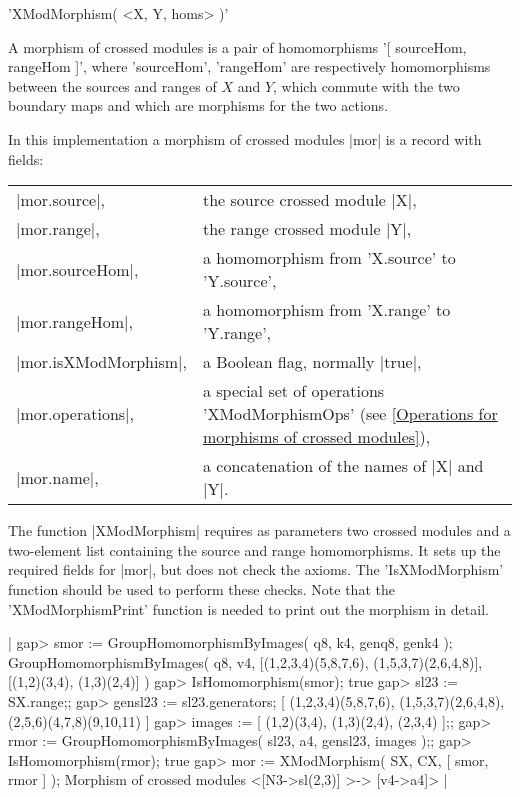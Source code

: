 %

'XModMorphism( <X, Y, homs> )'

A morphism of crossed modules is a pair of homomorphisms
'[ sourceHom, rangeHom ]',  where  'sourceHom', 'rangeHom'
are respectively homomorphisms between the sources and ranges
of  $X$  and  $Y$,  which commute with the two boundary maps
and which are morphisms for the two actions.

In this implementation a morphism of crossed modules  |mor|
is a record with fields:

\begin{tabular}{ll}
|mor.source|,         & the source crossed module  |X|,                \\
|mor.range|,          & the range crossed module  |Y|,                 \\
|mor.sourceHom|,      & a homomorphism from 'X.source' to 'Y.source',  \\
|mor.rangeHom|,       & a homomorphism from 'X.range' to 'Y.range',    \\
|mor.isXModMorphism|, & a Boolean flag, normally |true|,               \\
|mor.operations|,     & a special set of operations 'XModMorphismOps'
              (see \ref{Operations for morphisms of crossed modules}), \\
|mor.name|,           & a concatenation of the names of |X| and |Y|.
\end{tabular}

The function |XModMorphism| requires as parameters two crossed modules
and a two-element list containing the source and range homomorphisms.
It sets up the required fields for |mor|, but does not check the axioms.
The  'IsXModMorphism'  function should be used to perform these checks.
Note that the  'XModMorphismPrint'  function is needed to print out the
morphism in detail.

|    gap> smor := GroupHomomorphismByImages( q8, k4, genq8, genk4 );
    GroupHomomorphismByImages( q8, v4, 
     [(1,2,3,4)(5,8,7,6), (1,5,3,7)(2,6,4,8)], [(1,2)(3,4), (1,3)(2,4)] )
    gap> IsHomomorphism(smor);
    true
    gap> sl23 := SX.range;;
    gap> gensl23 := sl23.generators;
     [ (1,2,3,4)(5,8,7,6), (1,5,3,7)(2,6,4,8), (2,5,6)(4,7,8)(9,10,11) ]
    gap> images := [ (1,2)(3,4), (1,3)(2,4), (2,3,4) ];;
    gap> rmor := GroupHomomorphismByImages( sl23, a4, gensl23, images );;
    gap> IsHomomorphism(rmor);
    true
    gap> mor := XModMorphism( SX, CX, [ smor, rmor ] );
    Morphism of crossed modules <[N3->sl(2,3)] >-> [v4->a4]> |

